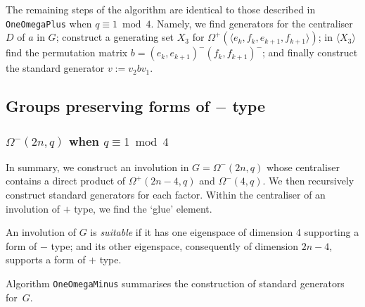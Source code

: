 \documentclass[12pt]{article}
\begin{document}
The remaining steps of the algorithm are identical
to those described in {\tt OneOmegaPlus} when $q\equiv1\bmod4$.
Namely, we find generators for the centraliser $D$ of $a$ in $G$;
construct a generating set $X_3$ 
for $\Omega^+(\langle e_k,f_k,e_{k+1},f_{k+1}\rangle)$;
in $\langle X_3\rangle$ find the permutation matrix 
$b=(e_k,e_{k+1})^{-}(f_k,f_{k+1})^{-}$;
and finally construct the standard generator $v := v_2 b v_1$.

\subsection{Groups preserving forms of $-$ type}
\subsubsection{$\Omega^-(2n,q)$ when $q\equiv 1\bmod 4$}\label{omega-}

In summary, we construct an involution in $G = \Omega^-(2n,q)$ whose centraliser
contains a direct product of $\Omega^+(2n-4,q)$ and $\Omega^-(4,q)$. 
We then recursively construct standard generators for each factor. 
Within the centraliser of an involution of $+$ type,
we find the `glue' element. 

An involution of $G$ is {\it suitable} 
if it has one eigenspace 
of dimension 4 supporting a form of $-$ type; and its 
other eigenspace, consequently of dimension $2n-4$,
supports a form of $+$ type.  

Algorithm {\tt OneOmegaMinus} summarises the construction
of standard generators for~$G$.
\end{document}
